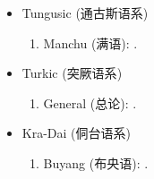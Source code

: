 \documentclass[oneside,a4paper,11pt]{article}
\newcommand{\zh}[1]{{\cn #1}}
\newcommand{\lingua}[3]{#1 (\zh{#3})}
\begin{document}
\begin{itemize}
\begin{enumerate}
\end{enumerate}
\item \lingua{Tungusic}{Toungouse}{通古斯语系}
\begin{enumerate}
\item \lingua{Manchu}{Mandchou}{满语}: \cite{fuente18am}.
\end{enumerate}
\item  \lingua{Turkic}{Turcique}{突厥语系}
\begin{enumerate}
\item \lingua{General}{Général}{总论}: \cite{antonov12kumush}.
\end{enumerate}
\item \lingua{Kra-Dai}{Kra-Dai}{侗台语系}
\begin{enumerate}
\item \lingua{Buyang}{Buyang}{布央语}: \cite{jacques17buyang}.
\end{enumerate}
\end{itemize}  
\end{document}
